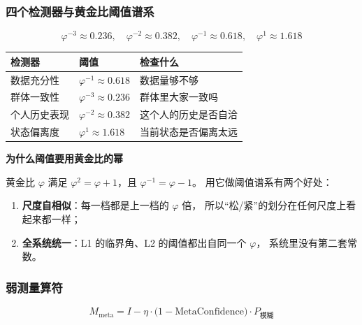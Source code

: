 \documentclass[UTF8,a4paper,11pt]{ctexart}
\newenvironment{explainbox}[1]
{\begin{center}\begin{minipage}{0.94\textwidth}\colorbox{boxbg}{\parbox{0.92\textwidth}{\textbf{#1}\par\vspace{2pt}}}}
{\end{minipage}\end{center}}
\begin{document}
\subsubsection{四个检测器与黄金比阈值谱系}

\begin{equation}
\varphi^{-3} \approx 0.236, \quad
\varphi^{-2} \approx 0.382, \quad
\varphi^{-1} \approx 0.618, \quad
\varphi^{1} \approx 1.618
\end{equation}

\begin{center}
\begin{tabular}{p{3.6cm}p{2.8cm}p{8.2cm}}
\toprule
\textbf{检测器} & \textbf{阈值} & \textbf{检查什么} \\
\midrule
数据充分性 & $\varphi^{-1} \approx 0.618$ & 数据量够不够 \\
群体一致性 & $\varphi^{-3} \approx 0.236$ & 群体里大家一致吗 \\
个人历史表现 & $\varphi^{-2} \approx 0.382$ & 这个人的历史是否自洽 \\
状态偏离度 & $\varphi^{1} \approx 1.618$ & 当前状态是否偏离太远 \\
\bottomrule
\end{tabular}
\end{center}

\begin{explainbox}{为什么阈值要用黄金比的幂}
黄金比 $\varphi$ 满足 $\varphi^2 = \varphi + 1$，且 $\varphi^{-1} = \varphi - 1$。
用它做阈值谱系有两个好处：
\begin{enumerate}[leftmargin=1.4em,itemsep=1pt]
\item \textbf{尺度自相似}：每一档都是上一档的 $\varphi$ 倍，
      所以“松/紧”的划分在任何尺度上看起来都一样；
\item \textbf{全系统统一}：L1 的临界角、L2 的阈值都出自同一个 $\varphi$，
      系统里没有第二套常数。
\end{enumerate}
\end{explainbox}

\subsubsection{弱测量算符}

\begin{equation}
M_{\text{meta}} = I - \eta \cdot \big(1 - \text{MetaConfidence}\big) \cdot P_{\text{模糊}}
\label{p3:eq:weak}
\end{equation}
\end{document}
